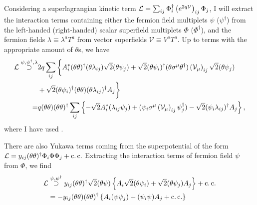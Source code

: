 \documentclass[../main.tex]{subfiles}
\begin{document}
Considering a superlagrangian kinetic term \(\mathcal{L} = \sum_{ij} \Phi^\dagger_i
\left(e^{2q \mathcal{V}}\right)_{ij} \Phi_j\), I will extract the interaction
terms containing either the fermion field multiplets \(\psi\) (\(\psi^\dagger\)) from the left-handed (right-handed) scalar superfield multiplets \(\Phi\) (\(\Phi^\dagger\)),
and the fermion fields \(\lambda \equiv \lambda^a T^a\) from vector superfields \(\mathcal{V} \equiv V^a T^a\).
Up to terms with the appropriate amount of \(\theta\)s, we have
\begin{align}
  \label{susy:eq:psi_kin_int}
  \nonumber
  \L \stackrel{\psi, \psi^\dagger, \lambda}{\supset} & 2q \sum_{ij} \bigg\{ A^\ast_i (\theta\theta)^\dagger (\theta\lambda_{ij}) \sqrt{2} (\theta\psi_j) + \sqrt{2} (\theta\psi_i)^\dagger (\theta\sigma\^\mu\theta^\dagger) \pclosed{\mathcal{V}_\mu}_{ij} \sqrt{2} (\theta\psi_j) \\
  \nonumber
                                                     & + \sqrt{2} (\theta\psi_i)^\dagger (\theta\theta) (\theta\lambda_{ij})^\dagger A_j \bigg\}                                                                                                                                    \\
  =                                                  & q(\theta\theta)(\theta\theta)^\dagger \sum_{ij} \cclosed{ -\sqrt{2} A^\ast_i (\lambda_{ij}\psi_j) + (\psi_i \sigma\^\mu \pclosed{\mathcal{V}_\mu}_{ij} \psi^\dagger_j) - \sqrt{2} (\psi_i\lambda_{ij})^\dagger A_j },
\end{align}
where I have used . 
\medskip

There are also Yukawa terms coming from the superpotential of the form \(\mathcal{L} =
y_{ij} (\theta\theta)^\dagger \Phi_i \Phi \Phi_j + \operatorname{c.c.}\) Extracting the
interaction terms of fermion field \(\psi\) from \(\Phi\), we find
\begin{align}
  \label{susy:eq:psi_yuk_int}
  \nonumber
  \mathcal{L} & \stackrel{\psi, \psi^\dagger}{\supset} y_{ij} (\theta\theta)^\dagger \sqrt{2} (\theta\psi) \left\{ A_i \sqrt{2}(\theta\psi_i) + \sqrt{2}(\theta\psi_j)A_j \right\} + \operatorname{c.c.} \\
     & = -y_{ij} (\theta\theta)(\theta\theta)^\dagger \left\{ A_i(\psi\psi_j) + (\psi_i\psi)A_j + \operatorname{c.c.} \right\}
\end{align}
\end{document}

